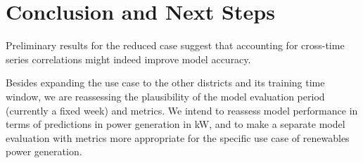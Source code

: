 \chapter{Conclusion and Next Steps}

Preliminary results for the reduced case suggest that accounting for cross-time series correlations might indeed improve model accuracy.

Besides expanding the use case to the other districts and its training time window, we are reassessing the plausibility of the model evaluation period (currently a fixed week) and metrics.
We intend to reassess model performance in terms of predictions in power generation in kW, and to make a separate model evaluation with metrics more appropriate for the specific use case of renewables power generation.


